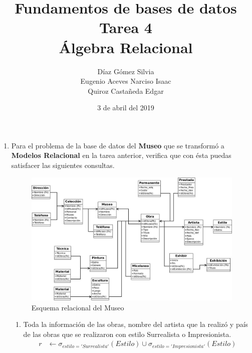 \documentclass{article}
\begin{document}
    \title{
        Fundamentos de bases de datos \\
        Tarea 4 \\
        Álgebra Relacional
    }
    \author{
        Díaz Gómez Silvia \\
        Eugenio Aceves Narciso Isaac \\
        Quiroz Castañeda Edgar
    }
    \date {
        3 de abril del 2019    
    }
    \maketitle

    \begin{enumerate}
        \item {
            Para el problema de la base de datos del \textbf{Museo} que se
            transformó a \textbf{Modelos Relacional} en la tarea anterior,
            verifica que con ésta puedas satisfacer las siguientes consultas.
            \begin{figure}[H]
                \centering
                \includegraphics[scale=0.4]{img/museo.jpeg}
                \caption{Esquema relacional del Museo}
            \end{figure}
            \begin{enumerate}
                \item {
                    Toda la información de las obras, nombre del artista que la
                    realizó y país de las obras que se realizaron con estilo
                    Surrealista o Impresionista.
                    \begin{align*}
                        r &\leftarrow \sigma_{estilo = 'Surrealista'}(Estilo) 
                        \cup \sigma_{estilo = 'Impresionista'}(Estilo) \\

\end{align*}}
\end{enumerate}}
\end{enumerate}
\end{document}
